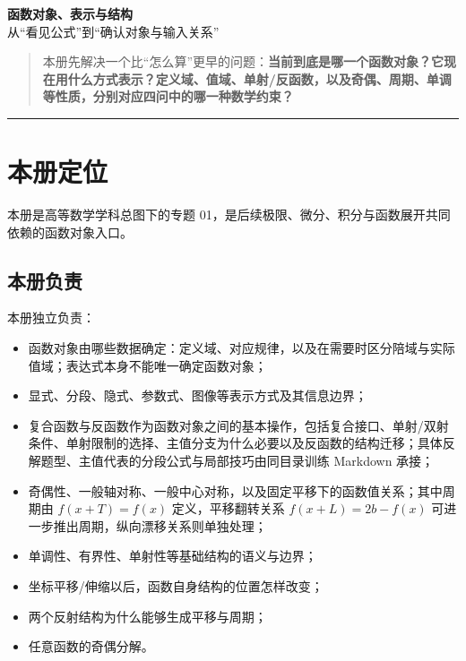 \documentclass[11pt,a4paper]{ctexart}
\providecommand{\tightlist}{}
\begin{document}
\begin{center}
{\LARGE\textbf{函数对象、表示与结构}}\\[0.4em]
{\large 从“看见公式”到“确认对象与输入关系”}
\end{center}
\vspace{0.5em}

\begin{quote}
本册先解决一个比``怎么算''更早的问题：\textbf{当前到底是哪一个函数对象？它现在用什么方式表示？定义域、值域、单射/反函数，以及奇偶、周期、单调等性质，分别对应四问中的哪一种数学约束？}
\end{quote}

\begin{center}\rule{0.5\linewidth}{0.5pt}\end{center}

\setcounter{section}{-1}
\section{本册定位}\label{ux672cux518cux5b9aux4f4d}

本册是高等数学学科总图下的专题 01，是后续极限、微分、积分与函数展开共同依赖的函数对象入口。

\subsection{本册负责}\label{own}

本册独立负责：

\begin{itemize}
\tightlist
\item
  函数对象由哪些数据确定：定义域、对应规律，以及在需要时区分陪域与实际值域；表达式本身不能唯一确定函数对象；
\item
  显式、分段、隐式、参数式、图像等表示方式及其信息边界；
\item
  复合函数与反函数作为函数对象之间的基本操作，包括复合接口、单射/双射条件、单射限制的选择、主值分支为什么必要以及反函数的结构迁移；具体反解题型、主值代表的分段公式与局部技巧由同目录训练 Markdown 承接；
\item
  奇偶性、一般轴对称、一般中心对称，以及固定平移下的函数值关系；其中周期由 $f(x+T)=f(x)$ 定义，平移翻转关系 $f(x+L)=2b-f(x)$ 可进一步推出周期，纵向漂移关系则单独处理；
\item
  单调性、有界性、单射性等基础结构的语义与边界；
\item
  坐标平移/伸缩以后，函数自身结构的位置怎样改变；
\item
  两个反射结构为什么能够生成平移与周期；
\item
  任意函数的奇偶分解。
\end{itemize}
\end{document}
